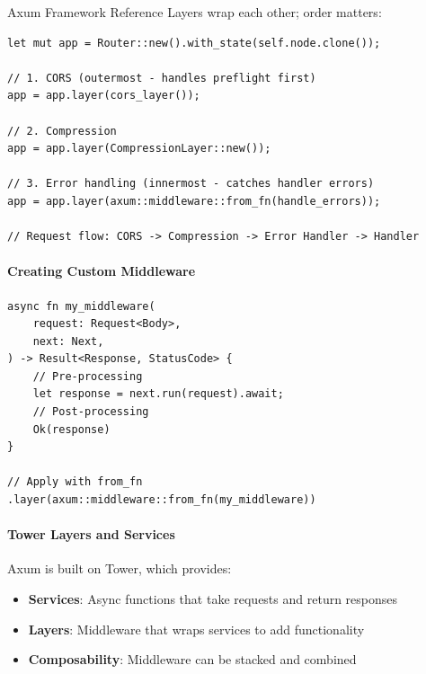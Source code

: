 \begin{deepdive}{Axum Framework Reference}
Layers wrap each other; order matters:

\begin{listing}[H]
\caption{Middleware layer order}
\label{lst:axum-middleware-order}
\begin{verbatim}
let mut app = Router::new().with_state(self.node.clone());

// 1. CORS (outermost - handles preflight first)
app = app.layer(cors_layer());

// 2. Compression
app = app.layer(CompressionLayer::new());

// 3. Error handling (innermost - catches handler errors)
app = app.layer(axum::middleware::from_fn(handle_errors));

// Request flow: CORS -> Compression -> Error Handler -> Handler
\end{verbatim}
\end{listing}

\paragraph{Creating Custom Middleware}

\begin{listing}[H]
\caption{Custom middleware pattern}
\label{lst:axum-custom-middleware}
\begin{verbatim}
async fn my_middleware(
    request: Request<Body>,
    next: Next,
) -> Result<Response, StatusCode> {
    // Pre-processing
    let response = next.run(request).await;
    // Post-processing
    Ok(response)
}

// Apply with from_fn
.layer(axum::middleware::from_fn(my_middleware))
\end{verbatim}
\end{listing}

\paragraph{Tower Layers and Services}

Axum is built on Tower, which provides:

\begin{itemize}
  \item \textbf{Services}: Async functions that take requests and return responses
  \item \textbf{Layers}: Middleware that wraps services to add functionality
  \item \textbf{Composability}: Middleware can be stacked and combined
\end{itemize}


\end{deepdive}

